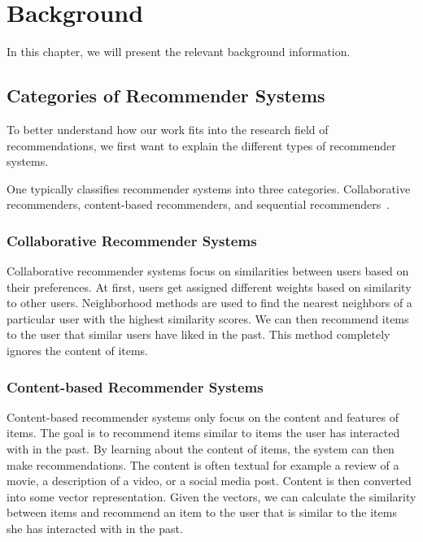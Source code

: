 \chapter{Background}

In this chapter, we will present the relevant background information.

\section{Categories of Recommender Systems}
To better understand how our work fits into the research field of recommendations, we first want to explain the different types of recommender systems.

One typically classifies recommender systems into three categories.
Collaborative recommenders, content-based recommenders, and sequential recommenders~\cite{melville2010recommender}.

\subsection{Collaborative Recommender Systems}
Collaborative recommender systems focus on similarities between users based on their preferences. At first, users get assigned different weights based on similarity to other users. Neighborhood methods are used to find the nearest neighbors of a particular user with the highest similarity scores. We can then recommend items to the user that similar users have liked in the past. This method completely ignores the content of items.

\subsection{Content-based Recommender Systems}
Content-based recommender systems only focus on the content and features of items. The goal is to recommend items similar to items the user has interacted with in the past. By learning about the content of items, the system can then make recommendations. The content is often textual for example a review of a movie, a description of a video, or a social media post. Content is then converted into some vector representation. Given the vectors, we can calculate the similarity between items and recommend an item to the user that is similar to the items she has interacted with in the past.

